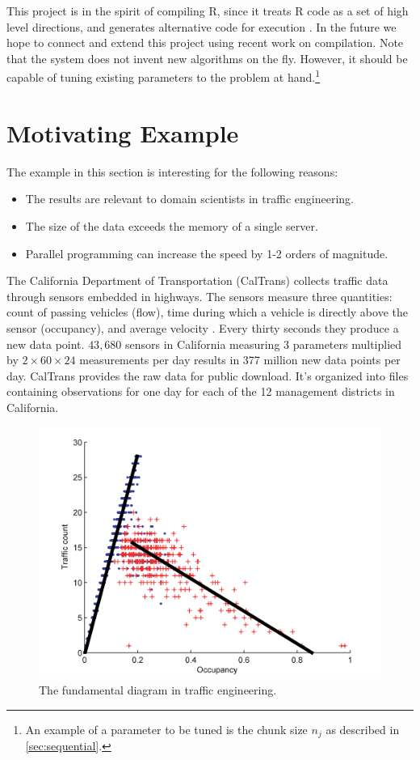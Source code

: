\documentclass[12pt]{article}
\begin{document}
This project is in the spirit of compiling R, since it treats R code as a
set of high level directions, and generates alternative code for execution
\cite{lang2014enhancing}. In the future we hope to connect and extend this
project using recent work on compilation. Note that the system does not
invent new algorithms on the fly. However, it should be capable of tuning
existing parameters to the problem at hand.\footnote{An example of a
parameter to be tuned is the chunk size $n_j$ as described in
\ref{sec:sequential}.} 

\section{Motivating Example}
\label{sec:pems}

The example in this section is interesting for the following reasons:
\begin{itemize}
    \item The results are relevant to domain scientists in traffic engineering.
    \item The size of the data exceeds the memory of a single server.
    \item Parallel programming can increase the speed by 1-2 orders of
        magnitude.
\end{itemize}

The California Department of Transportation (CalTrans) collects traffic data through
sensors embedded in highways. The sensors measure three quantities: count
of passing vehicles (flow), time during which a vehicle is directly above the
sensor (occupancy), and average velocity \cite{jia2001pems}.  Every thirty
seconds they produce a new data point. $43,680$ sensors in California
measuring 3 parameters multiplied by $2 \times 60 \times 24$ measurements
per day results in 377 million new data points per day.  CalTrans provides
the raw data for public download. It's organized into files containing
observations for one day for each of the 12 management districts in
California.

\begin{figure}
\centering
\includegraphics[width=.7\linewidth]{seminar/fundamental_diagram}
\caption{The fundamental diagram in traffic engineering.}
\label{fig:fundamental_diagram}
\end{figure}
\end{document}
